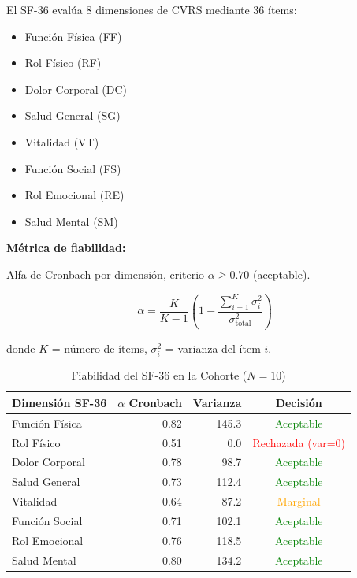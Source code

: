 \documentclass[12pt,letterpaper,twoside]{report}
\begin{document}
El SF-36 evalúa 8 dimensiones de CVRS mediante 36 ítems:
\begin{itemize}[noitemsep]
    \item Función Física (FF)
    \item Rol Físico (RF)
    \item Dolor Corporal (DC)
    \item Salud General (SG)
    \item Vitalidad (VT)
    \item Función Social (FS)
    \item Rol Emocional (RE)
    \item Salud Mental (SM)
\end{itemize}

\begin{estadisticobox}
\textbf{Métrica de fiabilidad:}

Alfa de Cronbach por dimensión, criterio $\alpha \geq 0.70$ (aceptable).

\begin{equation}
\alpha = \frac{K}{K-1} \left( 1 - \frac{\sum_{i=1}^{K} \sigma^2_i}{\sigma^2_{\text{total}}} \right)
\end{equation}

donde $K$ = número de ítems, $\sigma^2_i$ = varianza del ítem $i$.
\end{estadisticobox}

\begin{table}[H]
\centering
\caption{Fiabilidad del SF-36 en la Cohorte ($N=10$)}
\label{tab:sf36_reliability}
\begin{tabular}{@{}lrrc@{}}
\toprule
\textbf{Dimensión SF-36} & \textbf{$\alpha$ Cronbach} & \textbf{Varianza} & \textbf{Decisión} \\
\midrule
Función Física    & 0.82 & 145.3 & \textcolor{green}{Aceptable} \\
Rol Físico        & 0.51 & 0.0   & \textcolor{red}{Rechazada (var=0)} \\
Dolor Corporal    & 0.78 & 98.7  & \textcolor{green}{Aceptable} \\
Salud General     & 0.73 & 112.4 & \textcolor{green}{Aceptable} \\
Vitalidad         & 0.64 & 87.2  & \textcolor{orange}{Marginal} \\
Función Social    & 0.71 & 102.1 & \textcolor{green}{Aceptable} \\
Rol Emocional     & 0.76 & 118.5 & \textcolor{green}{Aceptable} \\
Salud Mental      & 0.80 & 134.2 & \textcolor{green}{Aceptable} \\
\bottomrule
\end{tabular}
\end{table}
\end{document}

